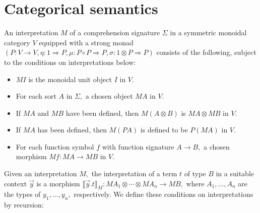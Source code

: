 \documentclass{article}
\newcommand{\maps}{\colon}
\newcommand{\interp}[1]{\llbracket #1 \rrbracket}
\begin{document}
\section{Categorical semantics}
An interpretation $M$ of a comprehension signature $\Sigma$ in a symmetric monoidal category $V$ equipped with a strong monad $(P\maps V \to V, \eta\maps 1 \Rightarrow P, \mu\maps P\circ P \Rightarrow P, \sigma\maps 1 \otimes P \Rightarrow P)$ consists of the following, subject to the conditions on interpretations below:
\begin{itemize}
  \item $MI$ is the monoidal unit object $I$ in $V.$
  \item For each sort $A$ in $\Sigma,$ a chosen object $MA$ in $V.$
  \item If $MA$ and $MB$ have been defined, then $M(A\otimes B)$ is $MA \otimes MB$ in $V.$
  \item If $MA$ has been defined, then $M(PA)$ is defined to be $P(MA)$ in $V.$
  \item For each function symbol $f$ with function signature $A \to B,$ a chosen morphism $Mf\maps MA \to MB$ in $V.$
\end{itemize}
Given an interpretation $M,$ the interpretation of a term $t$ of type $B$ in a suitable context $\vec{y}$ is a morphism ${\interp{\vec{y}.t}_M\maps MA_1 \otimes \cdots \otimes MA_n \to MB,}$ where $A_1, \ldots, A_n$ are the types of $y_1, \ldots, y_n,$ respectively.  We define these conditions on interpretations by recursion:
\end{document}
